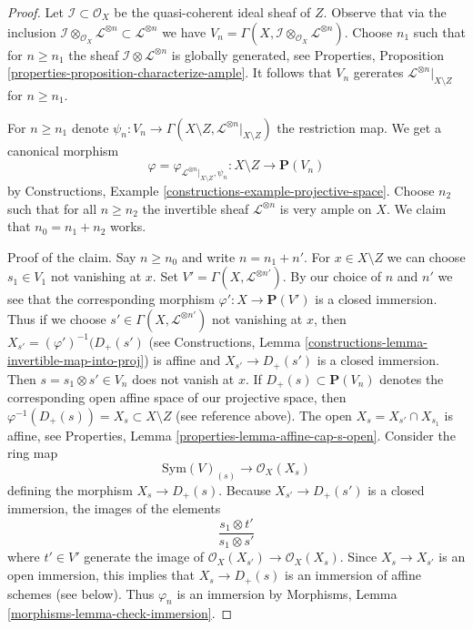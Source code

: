 \begin{proof}
Let $\mathcal{I} \subset \mathcal{O}_X$ be the quasi-coherent ideal sheaf of
$Z$. Observe that via the inclusion
$\mathcal{I} \otimes_{\mathcal{O}_X} \mathcal{L}^{\otimes n} \subset
\mathcal{L}^{\otimes n}$ we have
$V_n = \Gamma(X, \mathcal{I} \otimes_{\mathcal{O}_X} \mathcal{L}^{\otimes n})$.
Choose $n_1$ such that for $n \geq n_1$ the sheaf
$\mathcal{I} \otimes \mathcal{L}^{\otimes n}$ is globally generated, see
Properties, Proposition \ref{properties-proposition-characterize-ample}.
It follows that $V_n$ gererates $\mathcal{L}^{\otimes n}|_{X \setminus Z}$
for $n \geq n_1$.

\medskip\noindent
For $n \geq n_1$ denote
$\psi_n : V_n \to
\Gamma(X \setminus Z, \mathcal{L}^{\otimes n}|_{X \setminus Z})$
the restriction map. We get a canonical morphism
$$
\varphi = \varphi_{\mathcal{L}^{\otimes n}|_{X \setminus Z}, \psi_n} :
X \setminus Z
\longrightarrow
\mathbf{P}(V_n)
$$
by Constructions, Example \ref{constructions-example-projective-space}.
Choose $n_2$ such that for all $n \geq n_2$ the invertible sheaf
$\mathcal{L}^{\otimes n}$ is very ample on $X$.
We claim that $n_0 = n_1 + n_2$ works.

\medskip\noindent
Proof of the claim. Say $n \geq n_0$ and write $n = n_1 + n'$.
For $x \in X \setminus Z$ we can choose $s_1 \in V_1$ not
vanishing at $x$. Set $V' = \Gamma(X, \mathcal{L}^{\otimes n'})$.
By our choice of $n$ and $n'$ we see that the corresponding morphism
$\varphi' : X \to \mathbf{P}(V')$ is a closed immersion. Thus if we choose
$s' \in \Gamma(X, \mathcal{L}^{\otimes n'})$ not vanishing at $x$,
then $X_{s'} = (\varphi')^{-1}(D_+(s')$ (see
Constructions, Lemma \ref{constructions-lemma-invertible-map-into-proj})
is affine and $X_{s'} \to D_+(s')$ is a closed immersion.
Then $s = s_1 \otimes s' \in V_n$ does not vanish at $x$.
If $D_+(s) \subset \mathbf{P}(V_n)$ denotes the
corresponding open affine space of our projective space, then
$\varphi^{-1}(D_+(s)) = X_s \subset X \setminus Z$ (see reference above).
The open $X_s = X_{s'} \cap X_{s_1}$ is affine, see
Properties, Lemma \ref{properties-lemma-affine-cap-s-open}.
Consider the ring map
$$
\text{Sym}(V)_{(s)} \longrightarrow \mathcal{O}_X(X_s)
$$
defining the morphism $X_s \to D_+(s)$. Because $X_{s'} \to D_+(s')$
is a closed immersion, the images of the elements
$$
\frac{s_1 \otimes t'}{s_1 \otimes s'}
$$
where $t' \in V'$ generate the image of
$\mathcal{O}_X(X_{s'}) \to \mathcal{O}_X(X_s)$.
Since $X_s \to X_{s'}$ is an open immersion,
this implies that $X_s \to D_+(s)$ is an immersion of affine schemes
(see below). Thus $\varphi_n$ is an immersion by
Morphisms, Lemma \ref{morphisms-lemma-check-immersion}.


\end{proof}
